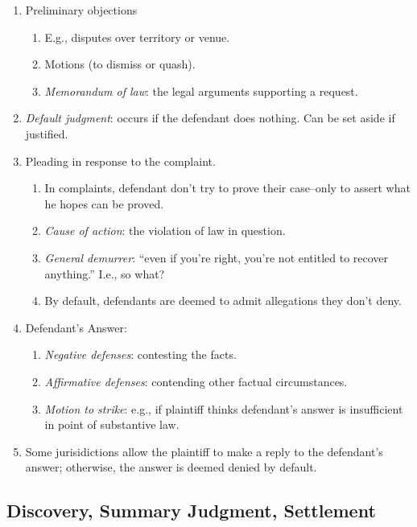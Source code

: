 \begin{enumerate}
    \item Preliminary objections
    \begin{enumerate}
        \item E.g., disputes over territory or venue.
        \item Motions (to dismiss or quash).
        \item \emph{Memorandum of law}: the legal arguments supporting a request.
    \end{enumerate}
    \item \emph{Default judgment}: occurs if the defendant does nothing. Can be set aside if justified.
    \item Pleading in response to the complaint.
    \begin{enumerate}
        \item In complaints, defendant don't try to prove their case--only to assert what he hopes can be proved.
        \item \emph{Cause of action}: the violation of law in question.
        \item \emph{General demurrer}: ``even if you're right, you're not entitled to recover anything.'' I.e., so what?
        \item By default, defendants are deemed to admit allegations they don't deny.
    \end{enumerate}
    \item Defendant's Answer:
    \begin{enumerate}
        \item \emph{Negative defenses}: contesting the facts.
        \item \emph{Affirmative defenses}: contending other factual circumstances.
        \item \emph{Motion to strike}: e.g., if plaintiff thinks defendant's answer is insufficient in point of substantive law.
    \end{enumerate}
    \item Some jurisidictions allow the plaintiff to make a reply to the defendant's answer; otherwise, the answer is deemed denied by default.
\end{enumerate}

\subsection{Discovery, Summary Judgment, Settlement}

